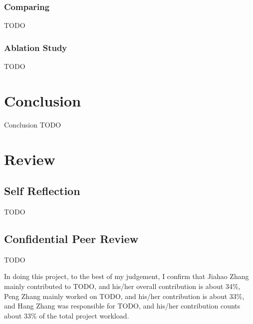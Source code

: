 \documentclass[final]{cvpr}
\begin{document}
\subsubsection{Comparing}

TODO

\subsubsection{Ablation Study}

TODO

\section{Conclusion}

Conclusion TODO

\cite{chenRethinkingAtrousConvolution2017}




\section{Review}

\subsection{Self Reflection}

TODO

\subsection{Confidential Peer Review}

TODO

In doing this project, to the best of my judgement,
I confirm that Jiahao Zhang mainly contributed to TODO,
and his/her overall contribution is about 34\%,
Peng Zhang mainly worked on TODO,
and his/her contribution is about 33\%,
and Hang Zhang was responsible for TODO,
and his/her contribution counts about 33\% of the total project workload.
\end{document}
